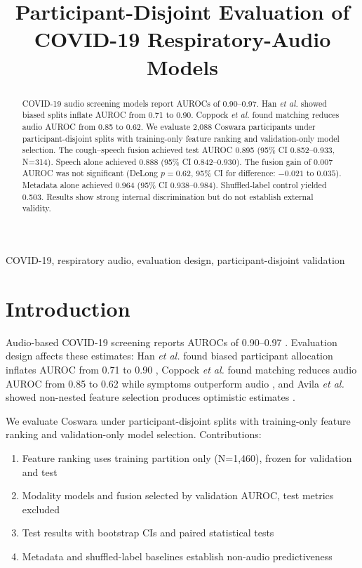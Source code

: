 \documentclass[conference]{IEEEtran}
\title{Participant-Disjoint Evaluation of COVID-19 Respiratory-Audio Models}
\author{
\IEEEauthorblockN{Nishant Harkut and Ritu Tiwari}
\IEEEauthorblockA{Department of Information Technology\\
ABV-IIITM Gwalior, India}
}
\begin{document}
\maketitle

\begin{abstract}
COVID-19 audio screening models report AUROCs of 0.90--0.97. Han \emph{et al.} showed biased splits inflate AUROC from 0.71 to 0.90. Coppock \emph{et al.} found matching reduces audio AUROC from 0.85 to 0.62. We evaluate 2,088 Coswara participants under participant-disjoint splits with training-only feature ranking and validation-only model selection. The cough--speech fusion achieved test AUROC 0.895 (95\% CI 0.852--0.933, N=314). Speech alone achieved 0.888 (95\% CI 0.842--0.930). The fusion gain of 0.007 AUROC was not significant (DeLong $p=0.62$, 95\% CI for difference: $-0.021$ to $0.035$). Metadata alone achieved 0.964 (95\% CI 0.938--0.984). Shuffled-label control yielded 0.503. Results show strong internal discrimination but do not establish external validity.
\end{abstract}

\begin{IEEEkeywords}
COVID-19, respiratory audio, evaluation design, participant-disjoint validation
\end{IEEEkeywords}

\section{Introduction}

Audio-based COVID-19 screening reports AUROCs of 0.90--0.97 \cite{laguarta2020cough,bhattacharya2023coswara,aytekin2024hst}. Evaluation design affects these estimates: Han \emph{et al.} found biased participant allocation inflates AUROC from 0.71 to 0.90 \cite{han2022realistic}, Coppock \emph{et al.} found matching reduces audio AUROC from 0.85 to 0.62 while symptoms outperform audio \cite{coppock2024audio}, and Avila \emph{et al.} showed non-nested feature selection produces optimistic estimates \cite{avila2021feature}.

We evaluate Coswara under participant-disjoint splits with training-only feature ranking and validation-only model selection. Contributions:
\begin{enumerate}
\item Feature ranking uses training partition only (N=1,460), frozen for validation and test
\item Modality models and fusion selected by validation AUROC, test metrics excluded
\item Test results with bootstrap CIs and paired statistical tests
\item Metadata and shuffled-label baselines establish non-audio predictiveness
\end{enumerate}
\end{document}
